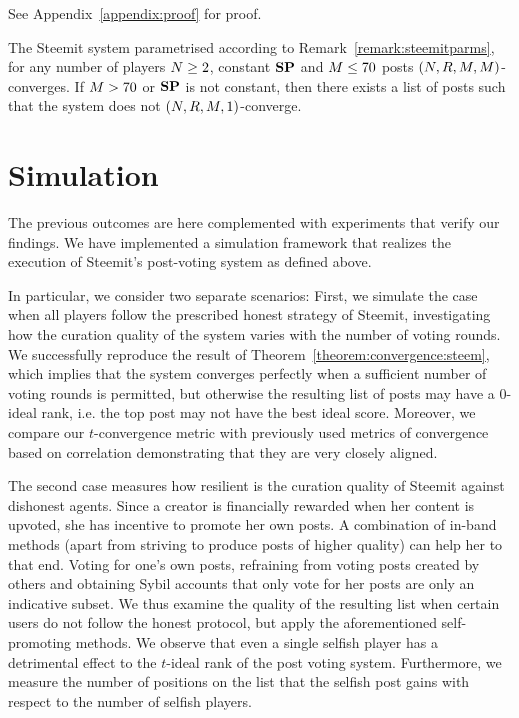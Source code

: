 \documentclass[a4paper,english,cleveref, autoref]{oasics-v2019}
\begin{document}
    See Appendix~\ref{appendix:proof} for proof.

\begin{corollary}
  \label{corollary:convergence:steem}
  The Steemit system parametrised according to Remark~\ref{remark:steemitparms},
  for any number of players $N \geq 2$, constant $\mathrm{\textbf{SP}}$ and
  $M \leq 70$ posts $\left(N, R, M,
  M\right)$-converges. If $M > 70$ or $\mathrm{\textbf{SP}}$ is not constant,
  then there exists a list of posts such that the system does not
  $\left(N, R, M, 1\right)$-converge.
\end{corollary}
\section{Simulation}
    The previous outcomes are here complemented with experiments that verify our
    findings. We have implemented a simulation framework that realizes the
    execution of Steemit's post-voting system as defined above.

    In particular, we consider two separate scenarios: First, we simulate the
    case when all players follow the prescribed honest strategy of Steemit,
    investigating how the curation quality of the system varies with the number
    of voting rounds. We successfully reproduce the result of
    Theorem~\ref{theorem:convergence:steem}, which implies that the system
    converges perfectly when a sufficient number of voting rounds is permitted,
    but otherwise the resulting list of posts may have a 0-ideal rank, i.e. the
    top post may not have the best ideal score. Moreover, we compare our
    $t$-convergence metric with previously used metrics of convergence based on
    correlation demonstrating that they are very closely aligned.

    The second case measures how resilient is the curation quality of Steemit
    against dishonest agents. Since a creator is financially rewarded when her
    content is upvoted, she has incentive to promote her own posts. A
    combination of in-band methods (apart from striving to produce posts of
    higher quality) can help her to that end. Voting for one's own posts,
    refraining from voting posts created by others and obtaining Sybil accounts
    that only vote for her posts are only an indicative subset. We thus examine
    the quality of the resulting list when certain users do not follow the
    honest protocol, but apply the aforementioned self-promoting methods. We
    observe that even a single selfish player has a detrimental effect to the
    $t$-ideal rank of the post voting system. Furthermore, we measure the number
    of positions on the list that the selfish post gains with respect to the
    number of selfish players.
\end{document}
